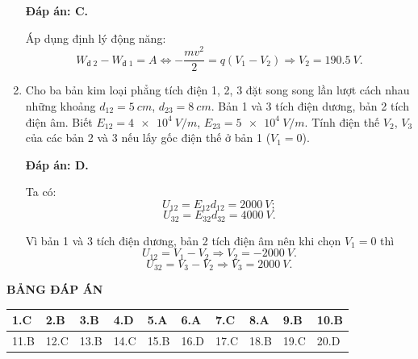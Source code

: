 \begin{enumerate}[label=\bfseries Câu \arabic*:]
{	}
	\loigiai
	{	\textbf{Đáp án: C.}
		
		Áp dụng định lý động năng:
		$$W_\text{đ 2} - W_\text{đ 1} = A \Leftrightarrow -\dfrac{mv^2}{2} = q(V_1 - V_2) \Rightarrow V_2 = \SI{190.5}{V}.$$
	}
	\item {}
	
	\cauhoi
	{Cho ba bản kim loại phẳng tích điện 1, 2, 3 đặt song song lần lượt cách nhau những khoảng $d_{12} = \SI{5}{cm}$, $d_{23} = \SI{8}{cm}$. Bản 1 và 3 tích điện dương, bản 2 tích điện âm. Biết $E_{12}=\SI{4e4}{V/m}$, $E_{23} = \SI{5e4}{V/m}$. Tính điện thế $V_2$, $V_3$ của các bản 2 và 3 nếu lấy gốc điện thế ở bản 1 ($V_1=0$).
		
	}
	\loigiai
	{	\textbf{Đáp án: D.}
		
		Ta có:
		$$U_{12} = E_{12} d_{12} = \SI{2000}{V};$$
		$$U_{32} = E_{32} d_{32} = \SI{4000}{V}.$$
		
		Vì bản 1 và 3 tích điện dương, bản 2 tích điện âm nên khi chọn $V_1=0$ thì
		$$U_{12} = V_1 - V_2 \Rightarrow V_2 = \SI{-2000}{V}.$$
		$$U_{32} = V_3 - V_2 \Rightarrow V_3 = \SI{2000}{V}.$$
	}
\end{enumerate}

\whiteBGstarEnd

\loigiai
{
	\begin{center}
		\textbf{BẢNG ĐÁP ÁN}
	\end{center}
	\begin{center}
		\begin{tabular}{|m{2.8em}|m{2.8em}|m{2.8em}|m{2.8em}|m{2.8em}|m{2.8em}|m{2.8em}|m{2.8em}|m{2.8em}|m{2.8em}|}
			\hline
			1.C  & 2.B  & 3.B  & 4.D  & 5.A  & 6.A  & 7.C  & 8.A  & 9.B  & 10.B  \\
			\hline
			11.B  & 12.C  & 13.B  & 14.C  & 15.B  & 16.D  & 17.C  & 18.B  & 19.C  & 20.D  \\
			\hline
		\end{tabular}
	\end{center}
}
